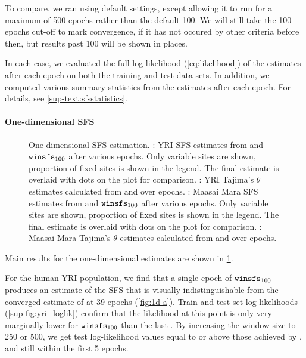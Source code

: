To compare, we ran \realsfs using default settings, except allowing it to run for a maximum of \num{500} epochs rather than the default \num{100}.
We will still take the \num{100} epochs cut-off to mark convergence, if it has not occured by other criteria before then, but results past \num{100} will be shown in places.

In each case, we evaluated the full log-likelihood (\cref{eq:likelihood}) of the estimates after each epoch on both the training and test data sets.
In addition, we computed various summary statistics from the estimates after each epoch.
For details, see \cref{sup-text:sfsstatistics}.

\paragraph{One-dimensional SFS}

\begin{figure}
    {
        \label{fig:1d-a}
        \label{fig:1d-b}
        \label{fig:1d-c}
        \label{fig:1d-d}
    }
    \begin{center}
    \end{center}
    \caption{
        One-dimensional SFS estimation.
        :
            YRI SFS estimates from \realsfs and $\winsfs[100]$ after various epochs.
            Only variable sites are shown, proportion of fixed sites is shown in the legend.
            The final \realsfs estimate is overlaid with dots on the \winsfs plot for comparison.
        :
            YRI Tajima's $\theta$ estimates calculated from \realsfs and \winsfs over epochs.
        :
            Maasai Mara SFS estimates from \realsfs and $\winsfs[100]$ after various epochs.
            Only variable sites are shown, proportion of fixed sites is shown in the legend.
            The final \realsfs estimate is overlaid with dots on the \winsfs plot for comparison.
        :
            Maasai Mara Tajima's $\theta$ estimates calculated from \realsfs and \winsfs over epochs.
    }
    \label{fig:1d}
\end{figure}

Main results for the one-dimensional estimates are shown in \cref{fig:1d}.

For the human YRI population, we find that a single epoch of $\winsfs[100]$ produces an estimate of the SFS that is visually indistinguishable from the converged estimate of \realsfs at \num{39} epochs (\cref{fig:1d-a}).
Train and test set log-likelihoods (\cref{sup-fig:yri_loglik}) confirm that the likelihood at this point is only very marginally lower for $\winsfs[100]$ than the last \realsfs.
By increasing the window size to \num{250} or \num{500}, we get test log-likelihood values equal to or above those achieved by \realsfs, and still within the first \num{5} epochs.

